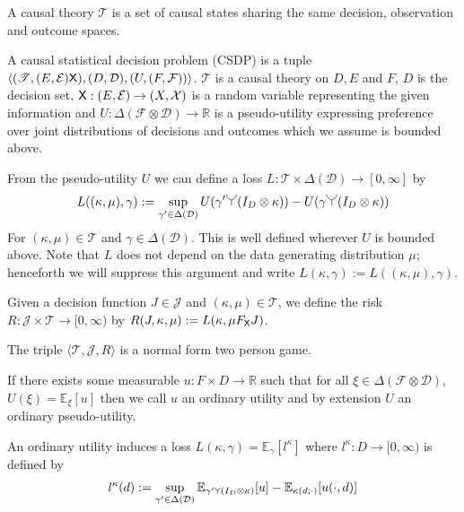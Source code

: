 \begin{definition}\label{def:causal_theory}
A causal theory $\mathscr{T}$ is a set of causal states sharing the same decision, observation and outcome spaces.
\end{definition}




\begin{definition}\label{def:CSDP}
A causal statistical decision problem (CSDP) is a tuple $\langle (\mathscr{T}, (E,\mathcal{E}) \mathsf{X}), (D,\mathcal{D}), (U,(F,\mathcal{F})) \rangle$. $\mathscr{T}$ is a causal theory on $D, E$ and $F$, $D$ is the decision set, $\mathsf{X}:(E,\mathcal{E})\to (X,\mathcal{X})$ is a random variable representing the given information and $U:\Delta(\mathcal{F}\otimes \mathcal{D})\to \mathbb{R}$ is a pseudo-utility expressing preference over joint distributions of decisions and outcomes which we assume is bounded above.

From the pseudo-utility $U$ we can define a loss $L:\mathscr{T}\times\Delta(\mathcal{D})\to [0,\infty]$ by
\begin{align}
    L((\kappa,\mu),\gamma) := \sup_{\gamma'\in\Delta(\mathcal{D})} U(\gamma'\splitter{0.15}(I_D\otimes \kappa)) - U(\gamma\splitter{0.15}(I_D\otimes \kappa))\label{eq:canonical_loss}
\end{align}
For $(\kappa,\mu)\in \mathscr{T}$ and $\gamma\in \Delta(\mathcal{D})$. This is well defined wherever $U$ is bounded above. Note that $L$ does not depend on the data generating distribution $\mu$; henceforth we will suppress this argument and write $L(\kappa,\gamma):= L((\kappa,\mu),\gamma)$.

Given a decision function $J\in\mathscr{J}$ and $(\kappa,\mu)\in \mathscr{T}$, we define the risk $R:\mathscr{J}\times \mathscr{T}\to [0,\infty)$ by $R(J,\kappa,\mu) := L(\kappa,\mu F_{\mathsf{X}} J)$.

The triple $\langle \mathscr{T}, \mathscr{J}, R\rangle$ is a normal form two person game.

If there exists some measurable $u:F\times D\to \mathbb{R}$ such that for all $\xi\in \Delta(\mathcal{F}\otimes\mathcal{D})$, $U(\xi)=\mathbb{E}_{\xi}[u]$ then we call $u$ an ordinary utility and by extension $U$ an ordinary pseudo-utility.

An ordinary utility induces a loss $L(\kappa,\gamma) = \mathbb{E}_{\gamma}[l^\kappa]$
where $l^\kappa:D\to [0,\infty)$ is defined by
\begin{align}
    l^\kappa(d) := \sup_{\gamma'\in \Delta(\mathcal{D})} \mathbb{E}_{\gamma'\splitter{0.08}(I_D\otimes \kappa)}[u] - \mathbb{E}_{\kappa(d;\cdot)}[u(\cdot,d)]\label{eq:induced_l}
\end{align}
\end{definition}

